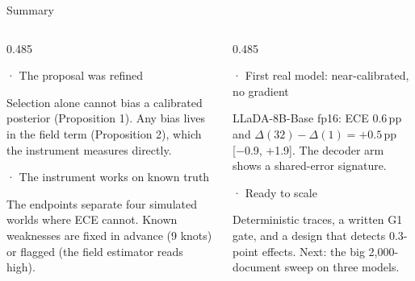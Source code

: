 \documentclass[aspectratio=169,10pt,t]{beamer}
\newcommand{\pp}{\,pp\xspace}
\newcommand{\ci}[1]{{\color{ink2}\scriptsize[#1]}}
\newcommand{\paneltitle}[1]{{\color{accentdark}\small\firasemibold #1}\par\vspace{0.8mm}}
\begin{document}
\begin{frame}{Summary}
  \vspace{2mm}
  \begin{columns}[T,onlytextwidth]
    \begin{column}{0.485\textwidth}
      \begin{panel}[height=25mm]
        \paneltitle{1 · The proposal was refined}
        Selection alone cannot bias a calibrated posterior (Proposition 1). Any bias lives
        in the field term (Proposition 2), which the instrument measures directly.
      \end{panel}
      \vspace{1.5mm}
      \begin{panel}[height=25mm]
        \paneltitle{2 · The instrument works on known truth}
        The endpoints separate four simulated worlds where ECE cannot. Known weaknesses are
        fixed in advance (9 knots) or flagged (the field estimator reads high).
      \end{panel}
    \end{column}
    \begin{column}{0.485\textwidth}
      \begin{panel}[height=25mm]
        \paneltitle{3 · First real model: near-calibrated, no gradient}
        LLaDA-8B-Base fp16: ECE 0.6\pp and $\Delta(32) - \Delta(1) = +0.5$\pp
        \ci{−0.9, +1.9}. The decoder arm shows a shared-error signature.
      \end{panel}
      \vspace{1.5mm}
      \begin{panel}[height=25mm]
        \paneltitle{4 · Ready to scale}
        Deterministic traces, a written G1 gate, and a design that detects 0.3-point effects.
        Next: the big 2,000-document sweep on three models.
      \end{panel}
    \end{column}
  \end{columns}
\end{frame}
\end{document}
